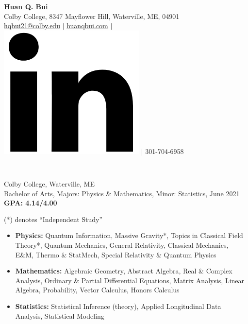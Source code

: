 \documentclass[letter, 10pt]{article}
\newcommand{\longunderline}[1]{\uline{#1\hfill\mbox{}}}
\begin{document}
	\begin{center}
		{\Large\textbf{Huan Q. Bui}}\\
		\smallskip
		Colby College, 8347 Mayflower Hill, Waterville, ME, 04901\\ \href{mailto:hqbui21@colby.edu}{\underline{hqbui21@colby.edu}} $\vert$ \href{https://huanqbui.com}{\underline{huanqbui.com}} $\vert$ \href{https://www.linkedin.com/in/huan-bui/}{\includegraphics[scale=0.04]{linkedin_logo.PNG}} $\vert$ 301-704-6958
	\end{center}
	\noindent \longunderline{\normalsize{{}}}\\
	\vspace{-7pt}
	
	
			\noindent Colby College, Waterville, ME\\
			Bachelor of Arts, {Majors}: Physics \& Mathematics, {Minor}: Statistics, June 2021 \hfill \textbf{GPA: 4.14/4.00}\\
			\vspace{-7pt}

			 (*) denotes ``Independent Study''
			\begin{itemize}[noitemsep, nolistsep]
				\item \textbf{Physics:} Quantum Information, Massive Gravity*, Topics in Classical Field Theory*, Quantum Mechanics, General Relativity, Classical Mechanics, E\&M, Thermo \& StatMech, Special Relativity \& Quantum Physics
				\item \textbf{Mathematics:} Algebraic Geometry, Abstract Algebra, Real \& Complex Analysis, Ordinary \& Partial Differential Equations, Matrix Analysis, Linear Algebra, Probability, Vector Calculus, Honors Calculus
				\item \textbf{Statistics:} Statistical Inference (theory), Applied Longitudinal Data Analysis, Statistical Modeling\\
			\end{itemize}
 
\end{document}
